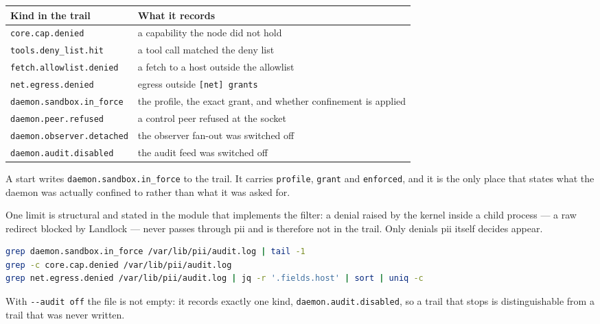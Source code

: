 \begin{center}\footnotesize
\begin{tabular}{@{}>{\raggedright\arraybackslash}p{}>{\raggedright\arraybackslash}p{}@{}}
  \toprule
  \textbf{Kind in the trail} & \textbf{What it records} \\
  \midrule
  \texttt{core.cap.denied} & a capability the node did not hold \\
  \texttt{tools.deny\_list.hit} & a tool call matched the deny list \\
  \texttt{fetch.allowlist.denied} & a fetch to a host outside the allowlist \\
  \texttt{net.egress.denied} & egress outside \texttt{[net] grants} \\
  \texttt{daemon.sandbox.in\_force} & the profile, the exact grant, and whether confinement is
    applied \\
  \texttt{daemon.peer.refused} & a control peer refused at the socket \\
  \texttt{daemon.observer.detached} & the observer fan-out was switched off \\
  \texttt{daemon.audit.disabled} & the audit feed was switched off \\
  \bottomrule
\end{tabular}
\end{center}

A start writes \texttt{daemon.sandbox.in\_force} to the trail. It carries \texttt{profile},
\texttt{grant} and \texttt{enforced}, and it is the only place that states what the daemon was
actually confined to rather than what it was asked for.

One limit is structural and stated in the module that implements the filter: a denial raised
by the kernel inside a child process --- a raw redirect blocked by Landlock --- never passes
through pii and is therefore not in the trail. Only denials pii itself decides appear.

\begin{lstlisting}[language=bash]
grep daemon.sandbox.in_force /var/lib/pii/audit.log | tail -1
grep -c core.cap.denied /var/lib/pii/audit.log
grep net.egress.denied /var/lib/pii/audit.log | jq -r '.fields.host' | sort | uniq -c
\end{lstlisting}

With \texttt{-{}-audit off} the file is not empty: it records exactly one kind,
\texttt{daemon.audit.disabled}, so a trail that stops is distinguishable from a trail that was
never written.

